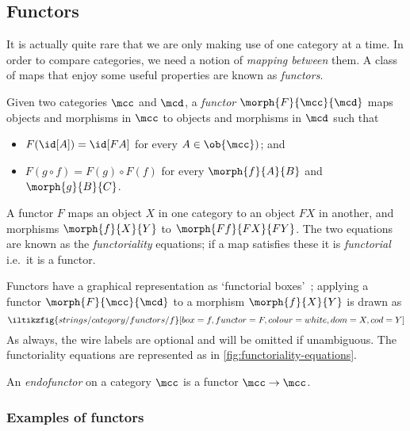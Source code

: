 \subsection{Functors}

It is actually quite rare that we are only making use of one category at a time.
In order to compare categories, we need a notion of \emph{mapping between} them.
A class of maps that enjoy some useful properties are known as \emph{functors}.

\begin{definition}[Functor]
    Given two categories \(\mcc\) and \(\mcd\), a \emph{functor} \(
        \morph{F}{\mcc}{\mcd}
    \) maps objects and morphisms in \(\mcc\) to objects and morphisms in
    \(\mcd\) such that
    \begin{itemize}
        \item \(F(\id[A]) = \id[FA]\) for every \(A \in \ob{\mcc})\); and
        \item \(F(g \circ f) = F(g) \circ F(f)\) for every \(\morph{f}{A}{B}\)
        and \(\morph{g}{B}{C}\).
    \end{itemize}
\end{definition}

A functor \(F\) maps an object \(X\) in one category to an object \(FX\) in
another, and morphisms \(\morph{f}{X}{Y}\) to \(\morph{Ff}{FX}{FY}\).
The two equations are known as the \emph{functoriality} equations; if a map
satisfies these it is \emph{functorial} i.e.\ it is a functor.

Functors have a graphical representation as `functorial
boxes'~\cite{mellies2006functorial}; applying a functor \(\morph{F}{\mcc}{\mcd}\)
to a morphism \(\morph{f}{X}{Y}\) is drawn as
\[
    \iltikzfig{strings/category/functors/f}[box=f,functor=F,colour=white,dom=X,cod=Y]
\]
As always, the wire labels are optional and will be omitted if unambiguous.
The functoriality equations are represented as in
\cref{fig:functoriality-equations}.



\begin{definition}[Endofunctor]
    An \emph{endofunctor} on a category \(\mcc\) is a functor \(\mcc \to \mcc\).
\end{definition}

\subsubsection{Examples of functors}

